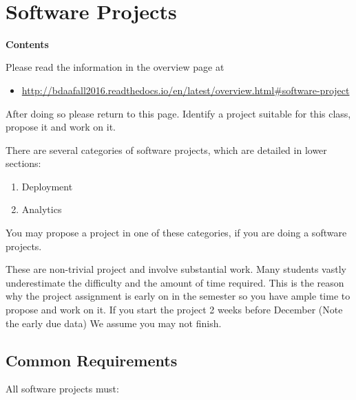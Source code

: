 \FILENAME\
\section{Software Projects}\label{software-projects}

\textbf{Contents}

Please read the information in the overview page at

\begin{itemize}

\item
  \url{http://bdaafall2016.readthedocs.io/en/latest/overview.html\#software-project}
\end{itemize}

After doing so please return to this page. Identify a project suitable
for this class, propose it and work on it.

There are several categories of software projects, which are detailed in
lower sections:

\begin{enumerate}

\item
  Deployment
\item
  Analytics
\end{enumerate}

You may propose a project in one of these categories, if you are doing a
software projects.

These are non-trivial project and involve substantial work. Many
students vastly underestimate the difficulty and the amount of time
required. This is the reason why the project assignment is early on in
the semester so you have ample time to propose and work on it. If you
start the project 2 weeks before December (Note the early due data) We
assume you may not finish.

\subsection{Common Requirements}\label{common-requirements}

All software projects must:


